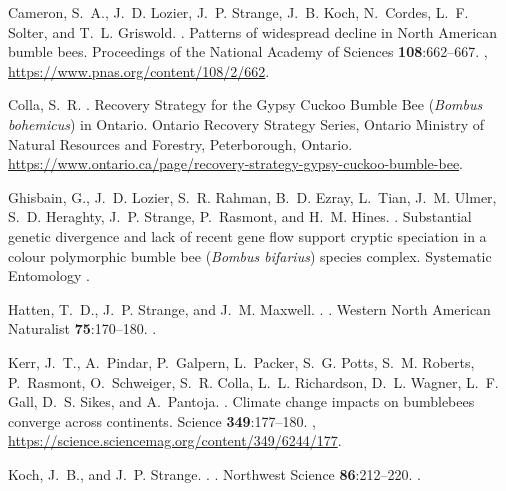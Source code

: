 \begin{multicols}{2}
\begin{thebibliography}{24}
Cameron, S.~A., J.~D. Lozier, J.~P. Strange, J.~B. Koch, N.~Cordes, L.~F.
  Solter, and T.~L. Griswold.
.
\newblock Patterns of widespread decline in North American bumble bees.
\newblock Proceedings of the National Academy of Sciences {\bfseries
  108}:662--667.
\newblock {},
  \urlprefix\url{https://www.pnas.org/content/108/2/662}.

Colla, S.~R.
.
\newblock Recovery Strategy for the Gypsy Cuckoo Bumble Bee (\textit{Bombus
  bohemicus}) in Ontario.
\newblock Ontario Recovery Strategy Series, Ontario Ministry of Natural
  Resources and Forestry, Peterborough, Ontario.
\newblock
  \urlprefix\url{https://www.ontario.ca/page/recovery-strategy-gypsy-cuckoo-bumble-bee}.

Ghisbain, G., J.~D. Lozier, S.~R. Rahman, B.~D. Ezray, L.~Tian, J.~M. Ulmer,
  S.~D. Heraghty, J.~P. Strange, P.~Rasmont, and H.~M. Hines.
.
\newblock Substantial genetic divergence and lack of recent gene flow support
  cryptic speciation in a colour polymorphic bumble bee (\textit{Bombus
  bifarius}) species complex.
\newblock Systematic Entomology .

Hatten, T.~D., J.~P. Strange, and J.~M. Maxwell.
.
.
\newblock Western North American Naturalist {\bfseries 75}:170--180.
\newblock {}.

Kerr, J.~T., A.~Pindar, P.~Galpern, L.~Packer, S.~G. Potts, S.~M. Roberts,
  P.~Rasmont, O.~Schweiger, S.~R. Colla, L.~L. Richardson, D.~L. Wagner, L.~F.
  Gall, D.~S. Sikes, and A.~Pantoja.
.
\newblock Climate change impacts on bumblebees converge across continents.
\newblock Science {\bfseries 349}:177--180.
\newblock {},
  \urlprefix\url{https://science.sciencemag.org/content/349/6244/177}.

Koch, J.~B., and J.~P. Strange.
.
.
\newblock Northwest Science {\bfseries 86}:212--220.
\newblock {}.


\end{thebibliography}
\end{multicols}
